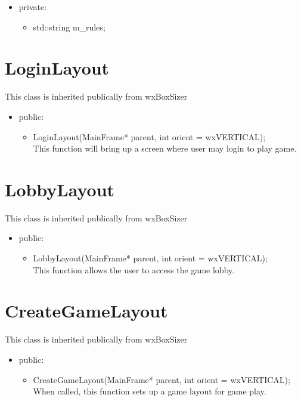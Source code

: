 \documentclass[]{scrartcl}
\begin{document}
 	\begin{itemize}
 		\item 	private:
 		\begin{itemize}
 			\item std::string m\_rules;
 		\end{itemize}
 	\end{itemize}


 \section{LoginLayout }
 	This class is inherited  publically from wxBoxSizer
 	\begin{itemize}
 		\item public:
 		\begin{itemize}
 			\item	LoginLayout(MainFrame* parent, int orient = wxVERTICAL);
 				\\This function will bring up a screen where user may login to play game.
 		\end{itemize}
 	\end{itemize}



 \section{LobbyLayout}
 	This class is inherited  publically from wxBoxSizer
 		\begin{itemize}
 			\item public:
 			\begin{itemize}
 				\item	LobbyLayout(MainFrame* parent, int orient = wxVERTICAL);
 					\\This function allows the user to access the game lobby.
 			\end{itemize}
 		\end{itemize}

 \section{CreateGameLayout}
 	This class is inherited  publically from wxBoxSizer

 		\begin{itemize}
 			\item public:
 			\begin{itemize}
 				\item	CreateGameLayout(MainFrame* parent, int orient = wxVERTICAL);
 					\\When called, this function sets up a game layout for game play.
 			\end{itemize}
 		\end{itemize}
\end{document}

